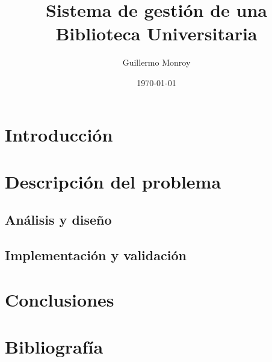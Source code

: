\documentclass[10pt,letterpaper]{article}
\title{Sistema de gestión de una Biblioteca Universitaria}
\author{Guillermo Monroy}
\date{\today}
\begin{document}
\maketitle
\tableofcontents
\lstlistoflistings

\section{Introducción}

\section{Descripción del problema}
\subsection{Análisis y diseño}
\subsection{Implementación y validación}





\section{Conclusiones}

\section{Bibliografía}
\end{document}
